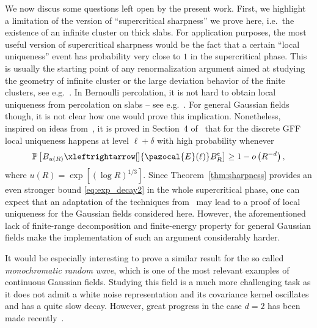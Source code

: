 \documentclass[AHL,Unicode,longabstracts,published]{cedram}
\renewcommand{\P}{\mathbb{P}}
\newcommand{\sfc}{\mathsf{c}}
\newcommand{\lr}[4]{#3\xleftrightarrow[#1]{#2} #4}
\begin{document}
We now discus some questions left open by the present work. First, we highlight a limitation of the version of ``supercritical sharpness'' we prove here, i.e.~the existence of an infinite cluster on thick slabs. For application purposes, the most useful version of supercritical sharpness would be the fact that a certain ``local uniqueness'' event has probability very close to $1$ in the supercritical phase. This is usually the starting point of any renormalization argument aimed at studying the geometry of infinite cluster or the large deviation behavior of the finite clusters, see e.g.~\cite{Cer00,Bar04,MR3650417}. In Bernoulli percolation, it is not hard to obtain local uniqueness from percolation on slabs -- see e.g.~\cite{Gri99a}. For general Gaussian fields though, it is not clear how one would prove this implication. Nonetheless, inspired on ideas from~\cite{benjaminitassion17}, it is proved in Section~4 of~\cite{DGRS19} that for the discrete GFF local uniqueness happens at level $\ell+\delta$ with high probability whenever 
\[
\P\left[\lr{}{\pazocal{E}(\ell)}{B_{u(R)}}{B_R^{\sfc}}\right]\geq 1-o\left(R^{-d}\right),
\]
where $u(R)=\exp[(\log R)^{1/3}]$. Since Theorem~\ref{thm:sharpness} provides an even stronger bound \eqref{eq:exp_decay2} in the whole supercritical phase, one can expect that an adaptation of the techniques from~\cite{DGRS19} may lead to a proof of local uniqueness for the Gaussian fields considered here. However, the aforementioned lack of finite-range decomposition and finite-energy property for general Gaussian fields make the implementation of such an argument considerably harder.

It would be especially interesting to prove a similar result for the so called \emph{monochromatic random wave}, which is one of the most relevant examples of continuous Gaussian fields. Studying this field is a much more challenging task as it does not admit a white noise representation and its covariance kernel oscillates and has a quite slow decay. However, great progress in the case $d=2$ has been made recently~\cite{MRV20}.
\end{document}
